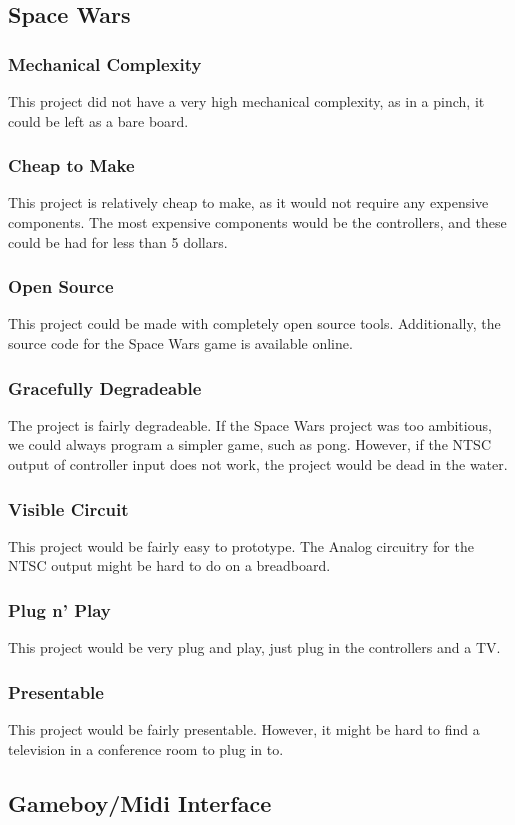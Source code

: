 \documentclass{article}
\begin{document}
\subsection{Space Wars}
\subsubsection {Mechanical Complexity}
This project did not have a very high mechanical complexity, as in a
pinch, it could be left as a bare board. 
\subsubsection{Cheap to Make}
This project is relatively cheap to make, as it would not require any
expensive components. The most expensive components would be the
controllers, and these could be had for less than 5 dollars. 
\subsubsection{Open Source}
This project could be made with completely open source
tools. Additionally, the source code for the Space Wars game is
available online.
\subsubsection{Gracefully Degradeable}
The project is fairly degradeable. If the Space Wars project was too
ambitious, we could always program a simpler game, such as
pong. However, if the NTSC output of controller input does not work,
the project would be dead in the water.
\subsubsection{Visible Circuit}
This project would be fairly easy to prototype. The Analog circuitry
for the NTSC output might be hard to do on a breadboard. 
\subsubsection{Plug n' Play}
This project would be very plug and play, just plug in the controllers and a TV.
\subsubsection{Presentable}
This project would be fairly presentable. However, it might be hard to
find a television in a conference room to plug in to. 

\subsection{Gameboy/Midi Interface}
\end{document}
